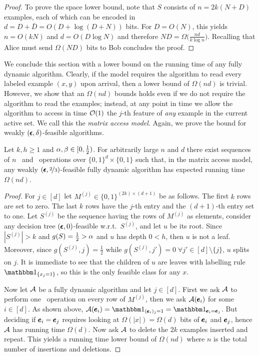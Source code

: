 \begin{proof}
To prove the space lower bound, note that $S$ consists of $n=2k(N+D)$ examples, each of which can be encoded in $d=D+\bar D = O(D + \log(D+N))$ bits. For $D = O(N)$, this yields $n=O(kN)$ and $d=O(D \log N)$ and therefore $ND = \Omega\big(\frac{nd}{k\log n}\big)$. Recalling that Alice must send $\Omega(ND)$ bits to Bob concludes the proof.
\end{proof}

We conclude this section with a lower bound on the running time of any fully dynamic algorithm. Clearly, if the model requires the algorithm to read every labeled example $(x,y)$ upon arrival, then a lower bound of $\Omega(nd)$ is trivial. However, we show that an $\Omega(nd)$ bounds holds even if we do not require the algorithm to read the examples; instead, at any point in time we allow the algorithm  to access in time $\mathcal{O}(1)$ the $j$-th feature of \emph{any} example in the current active set. We call this the \emph{matrix access model}. Again, we prove the bound for weakly $(\pmb{\epsilon},\delta)$-feasible algorithms.
\begin{theorem}\label{thm:time_lb}
Let $k,h \ge 1$ and $\alpha,\beta\in [0, \frac{1}{2})$. For arbitrarily large $n$ and $d$ there exist sequences of $n$ \ins\ and \del\ operations over $\{0,1\}^d \times \{0,1\}$ such that, in the matrix access model, any weakly $(\pmb{\epsilon},\nicefrac{2}{3})$-feasible fully dynamic algorithm has expected running time $\Omega(nd)$.
\end{theorem}

\begin{proof}
For $j \in [d]$ let $M^{(j)} \in \{0,1\}^{(2k) \times (d+1)}$ be as follows. The first $k$ rows are set to zero. The last $k$ rows have the $j$-th entry and the $(d+1)$-th entry set to one. Let $S^{(j)}$ be the sequence having the rows of $M^{(j)}$ as elements, consider any decision tree $(\pmb{\epsilon},0)$-feasible w.r.t.\ $S^{(j)}$, and let $u$ be its root. Since $|S^{(j)}|>k$ and $g(S)=\frac{1}{2}>\alpha$ and $u$ has depth $0<h$, then $u$ is not a leaf. Moreover, since $g(S^{(j)},j)=\frac{1}{2}$ while $g(S^{(j)},j')=0 \; \forall j' \in [d] \setminus \{j\}$, $u$ splits on $j$.
It is immediate to see that the children of $u$ are leaves with labelling rule $\Ind_{\{x_j=1\}}$, so this is the only feasible class for any $x$. %

Now let $\mathcal{A}$ be a fully dynamic algorithm and let $j \in [d]$. First we ask $\mathcal{A}$ to perform one \ins\ operation on every row of $M^{(j)}$, then we ask $\mathcal{A}(\pmb{e}_i)$ for some $i \in [d]$. As shown above, $\scA(\be_i)=\Ind_{(\be_i)_j=1}=\Ind_{\be_i=\be_j}$. But deciding if $\pmb{e}_i=\pmb{e}_j$ requires looking at $\Omega(|x|)=\Omega(d)$ bits of $\pmb{e}_i$ and $\pmb{e}_j$, hence $\mathcal{A}$ has running time $\Omega(d)$. Now ask $\mathcal{A}$ to delete the $2k$ examples inserted and repeat. This yields a running time lower bound of $\Omega(nd)$ where $n$ is the total number of insertions and deletions.
\end{proof}

